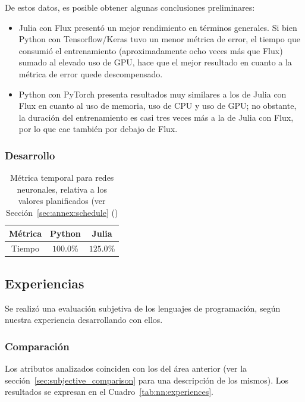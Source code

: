 \documentclass[11pt]{article}
\let\Oldsubsection\subsection
\renewcommand{\subsection}{\FloatBarrier\Oldsubsection}
\let\Oldsubsubsection\subsubsection
\renewcommand{\subsubsection}{\FloatBarrier\Oldsubsubsection}
\begin{document}
De estos datos, es posible obtener algunas conclusiones preliminares:

\begin{itemize}
    \item Julia con Flux presentó un mejor rendimiento en términos generales. Si bien Python con Tensorflow/Keras tuvo un menor métrica de error, el tiempo que consumió el entrenamiento (aproximadamente ocho veces más que Flux) sumado al elevado uso de GPU, hace que el mejor resultado en cuanto a la métrica de error quede descompensado.
    \item Python con PyTorch presenta resultados muy similares a los de Julia con Flux en cuanto al uso de memoria, uso de CPU y uso de GPU; no obstante, la duración del entrenamiento es casi tres veces más a la de Julia con Flux, por lo que cae también por debajo de Flux.
\end{itemize}



\subsubsection{Desarrollo}

\begin{table}[H]
\centering
\begin{tabular}{|c|c|c|}
\hline
Métrica & Python & Julia \\ \hline
Tiempo & $100.0$\% & $125.0$\% \\ \hline
\end{tabular}
\caption{Métrica temporal para redes neuronales, relativa a los valores planificados (ver Sección~\ref{sec:annex:schedule} ()}
\end{table}

\subsection{Experiencias}

Se realizó una evaluación subjetiva de los lenguajes de programación, según nuestra experiencia desarrollando con ellos.

\subsubsection{Comparación}

Los atributos analizados coinciden con los del área anterior (ver la sección~\ref{sec:subjective_comparison} para una descripción de los mismos).
Los resultados se expresan en el Cuadro~\ref{tab:nn:experiences}.
\end{document}
